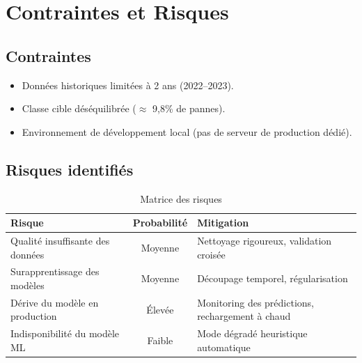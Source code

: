 \documentclass[a4paper,12pt]{report}
\begin{document}
\chapter{Contraintes et Risques}

\section{Contraintes}

\begin{itemize}
    \item Données historiques limitées à 2 ans (2022–2023).
    \item Classe cible déséquilibrée ($\approx$ 9,8\% de pannes).
    \item Environnement de développement local (pas de serveur de production dédié).
\end{itemize}

\section{Risques identifiés}

\begin{table}[h!]
\centering
\renewcommand{\arraystretch}{1.3}
\begin{tabularx}{\textwidth}{|X|c|X|}
\hline
\rowcolor{bpmblue!10}
\textbf{Risque} & \textbf{Probabilité} & \textbf{Mitigation} \\
\hline
Qualité insuffisante des données & Moyenne & Nettoyage rigoureux, validation croisée \\
\hline
Surapprentissage des modèles & Moyenne & Découpage temporel, régularisation \\
\hline
Dérive du modèle en production & Élevée & Monitoring des prédictions, rechargement à chaud \\
\hline
Indisponibilité du modèle ML & Faible & Mode dégradé heuristique automatique \\
\hline
\end{tabularx}
\caption{Matrice des risques}
\end{table}
\end{document}
